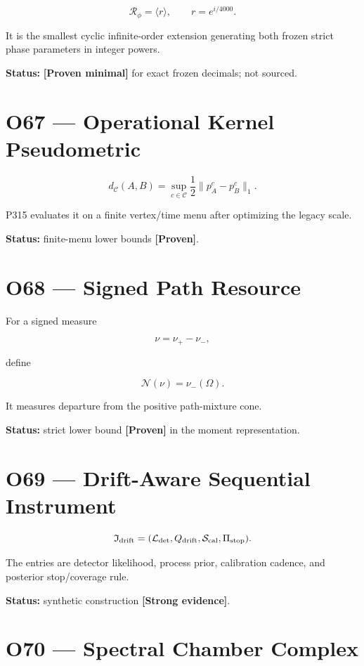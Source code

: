 \documentclass[11pt,a4paper,openany]{report}
\newcommand{\statusProven}{\textcolor{fingreen}{[Proven]}}
\newcommand{\statusStrong}{\textcolor{finblue}{[Strong evidence]}}
\begin{document}
\[
\mathcal R_\phi
=
\langle r\rangle,
\qquad
r=e^{i/4000}.
\]

It is the smallest cyclic infinite-order extension generating both frozen strict phase parameters in integer powers.

\textbf{Status:} \textbf{[Proven minimal]} for exact frozen decimals; not sourced.

\section{O67 --- Operational Kernel Pseudometric}

\[
d_{\mathcal C}(A,B)
=
\sup_{c\in\mathcal C}
\frac12\|p_A^c-p_B^c\|_1.
\]

P315 evaluates it on a finite vertex/\allowbreak{}time menu after optimizing the legacy scale.

\textbf{Status:} finite-menu lower bounds \textbf{\statusProven{}}.

\section{O68 --- Signed Path Resource}

For a signed measure

\[
\nu=\nu_+-\nu_-,
\]

define

\[
\mathcal N(\nu)=\nu_-(\Omega).
\]

It measures departure from the positive path-mixture cone.

\textbf{Status:} strict lower bound \textbf{\statusProven{}} in the moment representation.

\section{O69 --- Drift-Aware Sequential Instrument}

\[
\mathfrak I_{\rm drift}
=
(\mathcal L_{\rm det},Q_{\rm drift},
\mathcal S_{\rm cal},\Pi_{\rm stop}).
\]

The entries are detector likelihood, process prior, calibration cadence, and posterior stop/\allowbreak{}coverage rule.

\textbf{Status:} synthetic construction \textbf{\statusStrong{}}.

\section{O70 --- Spectral Chamber Complex}
\end{document}
